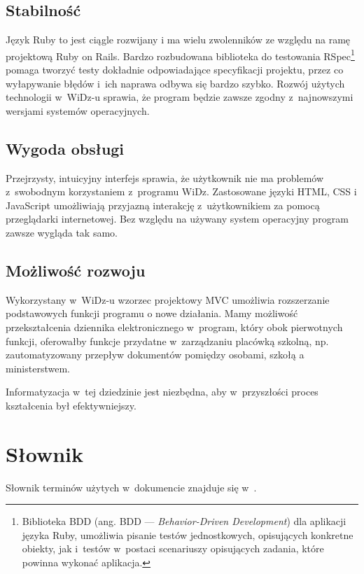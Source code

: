 \documentclass[12pt,leqno,twoside]{mwart}
\begin{document}
\subsection{Stabilność}
\noindent Język Ruby to jest ciągle rozwijany i ma wielu zwolenników ze względu na ramę projektową Ruby on Rails. Bardzo rozbudowana biblioteka do testowania RSpec\footnote{Biblioteka BDD (ang. BDD --- \textit{Behavior-Driven Development}) dla aplikacji języka Ruby, umożliwia pisanie testów jednostkowych, opisujących konkretne obiekty, jak i~testów w~postaci scenariuszy opisujących zadania, które powinna wykonać aplikacja.} pomaga tworzyć testy dokładnie odpowiadające specyfikacji projektu, przez co wyłapywanie błędów i~ich naprawa odbywa się bardzo szybko. Rozwój użytych technologii w~WiDz-u sprawia, że program będzie zawsze zgodny z~najnowszymi wersjami systemów operacyjnych.

\subsection{Wygoda obsługi}
\noindent Przejrzysty, intuicyjny interfejs sprawia, że użytkownik nie ma problemów z~swobodnym korzystaniem z~programu WiDz. Zastosowane języki HTML, CSS i JavaScript umożliwiają przyjazną interakcję z~użytkownikiem za pomocą przeglądarki internetowej. Bez względu na używany system operacyjny program zawsze wygląda tak samo.

\subsection{Możliwość rozwoju}
\noindent Wykorzystany w~WiDz-u wzorzec projektowy MVC umożliwia rozszerzanie podstawowych funkcji programu o nowe działania. Mamy możliwość przekształcenia dziennika elektronicznego w~program, który obok pierwotnych funkcji, oferowałby funkcje przydatne w~zarządzaniu placówką szkolną, np. zautomatyzowany przepływ dokumentów pomiędzy osobami, szkołą a ministerstwem.

\indent Informatyzacja w~tej dziedzinie jest niezbędna, aby w~przyszłości proces kształcenia był efektywniejszy.

\section{Słownik}
\noindent Słownik terminów użytych w~dokumencie znajduje się w~\cite{SLO}.
\end{document}
